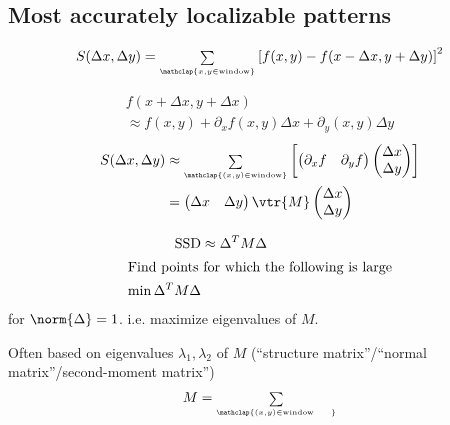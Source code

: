 \subsection{Most accurately localizable patterns}
\begin{compactdesc}
\item[\lp{Local displacement sensitivity}] 
	\begin{gather*}
		S(\Delta x,\Delta y) ={\scriptstyle\sum\limits_{\mathclap{x,y\in \text{window}}}}^{}\left[ f(x,y)-f(x-\Delta x,y+\Delta y) \right]^2
	\end{gather*}
\item[\lp{Linear approximation for small $\Delta x,\Delta y$}]
	\begin{multline*}
		f(x+\Delta x,y+\Delta x)\\\approx f(x,y)+\partial_x f(x,y)\Delta x+\partial_y(x,y)\Delta y
	\end{multline*}
	\begin{align*}
		S(\Delta x,\Delta y)&\approx{\scriptstyle\sum\limits_{\mathclap{(x,y)\in\text{window}}}}^{}
		\left[
		\begin{pmatrix}
			\partial_x f&\partial_y f
		\end{pmatrix}
		\begin{pmatrix}
			\Delta x\\
			\Delta y
		\end{pmatrix}
		\right]\\
		&=
		\begin{pmatrix}
			\Delta x&\Delta y
		\end{pmatrix}
		\vtr{M}
		\begin{pmatrix}
			\Delta x\\
			\Delta y
		\end{pmatrix}
	\end{align*}
	\item[\lp{Feature point extraction}]
		\begin{align*}
			\text{SSD}&\approx\Delta^{T}M\Delta\\
			\shortintertext{Find points for which the following is large}
			\min \Delta^{T}M\Delta
		\end{align*}
		for $\norm{\Delta}=1$. i.e. maximize eigenvalues of $M$.
	\item[\lp{Keypoint detection}]
		Often based on eigenvalues $\lambda_1,\lambda_2$ of $M$ (``structure matrix''/``normal matrix''/second-moment matrix'')
		\begin{gather*}
			M={\scriptstyle\sum\limits_{\mathclap{(x,y)\in \text{window}\quad\,\,}}}^{}

\end{gather*}
\end{compactdesc}

